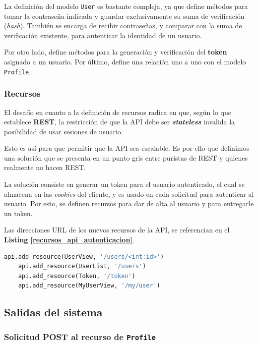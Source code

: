 La definición del modelo \texttt{User} es bastante compleja, ya que define métodos para tomar la contraseña indicada y guardar exclusivamente su suma de verificación (\textit{hash}).
También se encarga de recibir contraseñas, y comparar con la suma de verificación existente, para autenticar la identidad de un usuario.

Por otro lado, define métodos para la generación y verificación del \textbf{token} asignado a un usuario.
Por último, define una relación uno a uno con el modelo \texttt{Profile}.


\subsubsection{Recursos}

El desafío en cuanto a la definición de recursos radica en que, según lo que establece \textbf{REST}, la restricción de que la API debe ser \textbf{\textit{stateless}} invalida la posibilidad de usar sesiones de usuario.

Esto es así para que permitir que la API sea escalable.
Es por ello que definimos una solución que se presenta en un punto gris entre puristas de REST y quienes realmente no hacen REST.

La solución consiste en generar un token para el usuario autenticado, el cual se almacena en las \textit{cookies} del cliente, y es usado en cada solicitud para autenticar al usuario.
Por esto, se definen recursos para dar de alta al usuario y para entregarle un token.

Las direcciones URL de los nuevos recursos de la API, se referencian en el \textbf{Listing \ref{recursos_api_autenticacion}}.

	\begin{lstlisting}[language=Python, caption=Listado de recursos añadidos por la API., label=recursos_api_autenticacion]
	api.add_resource(UserView, '/users/<int:id>')
	api.add_resource(UserList, '/users')
	api.add_resource(Token, '/token')
	api.add_resource(MyUserView, '/my/user')
	\end{lstlisting}

\subsection {Salidas del sistema}


\subsubsection{Solicitud POST al recurso de \texttt{Profile}}
    
